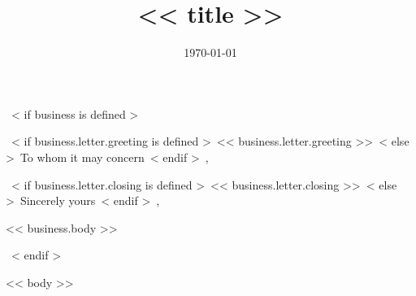 \documentclass[<< theme.font_size >>]{moderncv}
\title{<< title >>}
\begin{document}
~< if business is defined >~
\date{\today}
\opening{~< if business.letter.greeting is defined >~<< business.letter.greeting >>~< else >~To whom it may concern~< endif >~,}
\closing{~< if business.letter.closing is defined >~<< business.letter.closing >>~< else >~Sincerely yours~< endif >~,}

\makelettertitle            %
<< business.body >>

\makeletterclosing          %
\newpage
\setcounter{page}{1}
~< endif >~


\makecvtitle
\vspace{-20pt}

<< body >>
\end{document}
